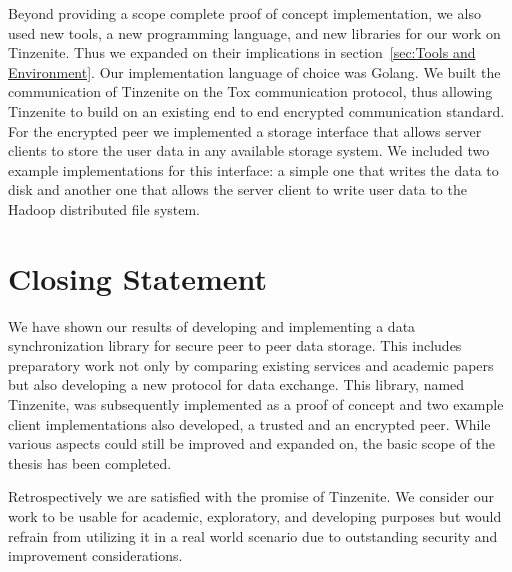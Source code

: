 Beyond providing a scope complete proof of concept implementation, we also used new tools, a new programming language, and new libraries for our work on Tinzenite.
Thus we expanded on their implications in section~\ref{sec:Tools and Environment}.
Our implementation language of choice was Golang.
We built the communication of Tinzenite on the Tox communication protocol, thus allowing Tinzenite to build on an existing end to end encrypted communication standard.
For the encrypted peer we implemented a storage interface that allows server clients to store the user data in any available storage system.
We included two example implementations for this interface: a simple one that writes the data to disk and another one that allows the server client to write user data to the Hadoop distributed file system.

\section{Closing Statement}
\label{sec:Closing Statement}

We have shown our results of developing and implementing a data synchronization library for secure peer to peer data storage.
This includes preparatory work not only by comparing existing services and academic papers but also developing a new protocol for data exchange.
This library, named Tinzenite, was subsequently implemented as a proof of concept and two example client implementations also developed, a trusted and an encrypted peer.
While various aspects could still be improved and expanded on, the basic scope of the thesis has been completed.

Retrospectively we are satisfied with the promise of Tinzenite.
We consider our work to be usable for academic, exploratory, and developing purposes but would refrain from utilizing it in a real world scenario due to outstanding security and improvement considerations.
